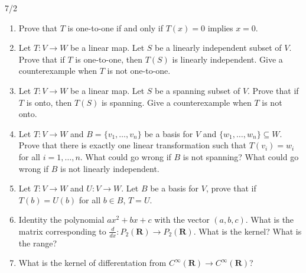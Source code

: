 \documentclass{article}
\begin{document}
\begin{center}
    7/2
\end{center}
\begin{enumerate}
    \item
        Prove that $T$ is one-to-one if and only if $T(x)=0$ implies $x=0$.
    \item
        Let $T:V\to W$ be a linear map. Let $S$ be a linearly independent
        subset of $V$. Prove that if $T$ is one-to-one, then $T(S)$ is linearly
        independent. Give a counterexample when $T$ is not one-to-one.
    \item
        Let $T:V\to W$ be a linear map. Let $S$ be a spanning
        subset of $V$. Prove that if $T$ is onto, then $T(S)$ is 
        spanning. Give a counterexample when $T$ is not onto.
    \item
        Let $T:V\to W$ and $B = \{v_1,\ldots,v_n\}$ be a basis for $V$ and
        $\{w_1,\ldots,w_n\}\subseteq W$. Prove that there is exactly
        one linear transformation such that $T(v_i)=w_i$ for all
        $i=1,\ldots,n$. What could go wrong if $B$ is not spanning? What could
        go wrong if $B$ is not linearly independent.
    \item
        Let $T:V\to W$ and $U:V\to W$. Let $B$ be a basis for $V$, prove that
        if $T(b)=U(b)$ for all $b\in B$, $T=U$.
    \item
        Identity the polynomial $ax^2+bx+c$ with the vector $(a,b,c)$. What is
        the matrix corresponding to $\frac{d}{dx}:P_2(\mathbf{R})\to
        P_2(\mathbf{R})$. What is the kernel? What is the range? 
    \item
        What is the kernel of differentation from $C^\infty(\mathbf{R})\to
        C^\infty(\mathbf{R})$?
\end{enumerate}

    
\end{document}
